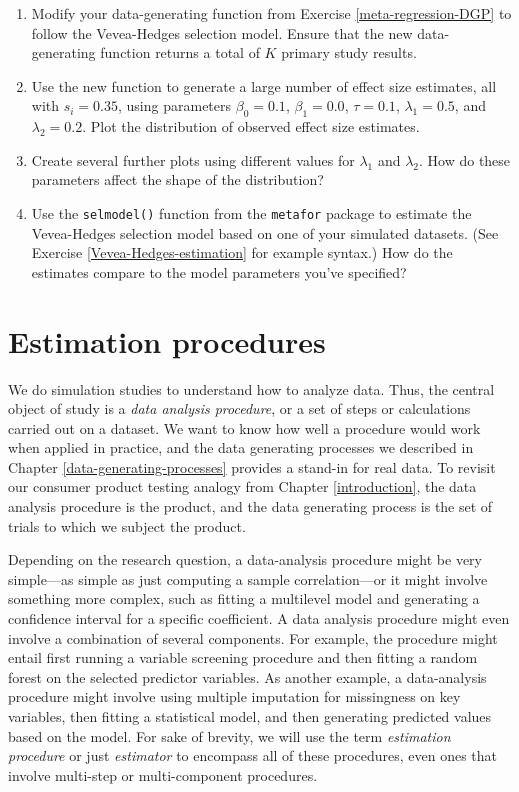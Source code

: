 \documentclass[
]{book}
\begin{document}
\begin{enumerate}
\def\labelenumi{\arabic{enumi}.}
\item
  Modify your data-generating function from Exercise \ref{meta-regression-DGP} to follow the Vevea-Hedges selection model. Ensure that the new data-generating function returns a total of \(K\) primary study results.
\item
  Use the new function to generate a large number of effect size estimates, all with \(s_i = 0.35\), using parameters \(\beta_0 = 0.1\), \(\beta_1 = 0.0\), \(\tau = 0.1\), \(\lambda_1 = 0.5\), and \(\lambda_2 = 0.2\). Plot the distribution of observed effect size estimates.
\item
  Create several further plots using different values for \(\lambda_1\) and \(\lambda_2\). How do these parameters affect the shape of the distribution?
\item
  Use the \texttt{selmodel()} function from the \texttt{metafor} package to estimate the Vevea-Hedges selection model based on one of your simulated datasets. (See Exercise \ref{Vevea-Hedges-estimation} for example syntax.) How do the estimates compare to the model parameters you've specified?
\end{enumerate}

\chapter{Estimation procedures}\label{estimation-procedures}

We do simulation studies to understand how to analyze data.
Thus, the central object of study is a \emph{data analysis procedure}, or a set of steps or calculations carried out on a dataset.
We want to know how well a procedure would work when applied in practice, and the data generating processes we described in Chapter \ref{data-generating-processes} provides a stand-in for real data.
To revisit our consumer product testing analogy from Chapter \ref{introduction}, the data analysis procedure is the product, and the data generating process is the set of trials to which we subject the product.

Depending on the research question, a data-analysis procedure might be very simple---as simple as just computing a sample correlation---or it might involve something more complex, such as fitting a multilevel model and generating a confidence interval for a specific coefficient.
A data analysis procedure might even involve a combination of several components.
For example, the procedure might entail first running a variable screening procedure and then fitting a random forest on the selected predictor variables.
As another example, a data-analysis procedure might involve using multiple imputation for missingness on key variables, then fitting a statistical model, and then generating predicted values based on the model. For sake of brevity, we will use the term \emph{estimation procedure} or just \emph{estimator} to encompass all of these procedures, even ones that involve multi-step or multi-component procedures.
\end{document}
